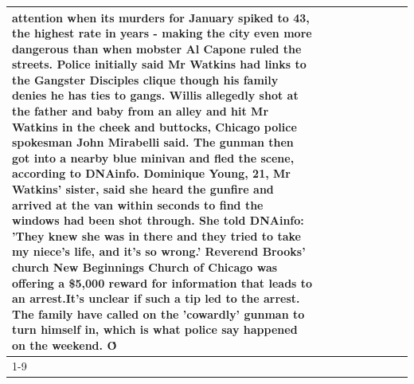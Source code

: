 \begin{table}[H]
\begin{tabular}{lllrlllll}
attention when its murders for January spiked to 43, the highest rate in years - making the city even more dangerous than when mobster Al Capone ruled the streets. Police initially said Mr Watkins had links to the Gangster Disciples clique though his family denies he has ties to gangs. Willis allegedly shot at the father and baby from an alley and hit Mr Watkins in the cheek and buttocks, Chicago police spokesman John Mirabelli said. The gunman then got into a nearby blue minivan and fled the scene, according to DNAinfo. Dominique Young, 21, Mr Watkins' sister, said she heard the gunfire and arrived at the van within seconds to find the windows had been shot through. She told DNAinfo: 'They knew she was in there and they tried to take my niece's life, and it's so wrong.' Reverend Brooks' church New Beginnings Church of Chicago was offering a \$5,000 reward for information that leads to an arrest.It's unclear if such a tip led to the arrest. The family have called on the 'cowardly' gunman to turn himself in, which is what police say happened on the weekend. Ό \\
\cline{1-9}

\end{tabular}
\end{table}
